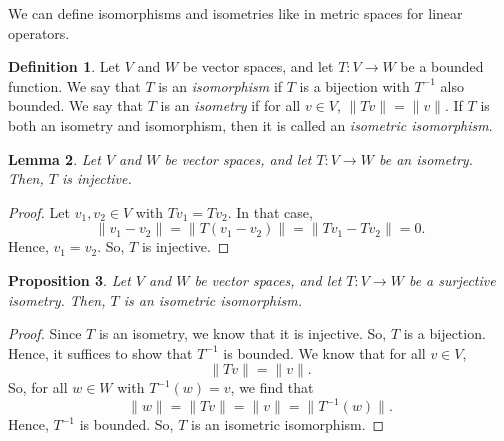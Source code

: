 \documentclass[a4paper, openany]{memoir}
\theoremstyle{definition}
\newtheorem{definition}{Definition}[section]
\theoremstyle{plain}
\newtheorem{lemma}[definition]{Lemma}
\newtheorem{proposition}[definition]{Proposition}
\begin{document}
    We can define isomorphisms and isometries like in metric spaces for linear operators.
    \begin{definition}
        Let $V$ and $W$ be vector spaces, and let $T \colon V \to W$ be a bounded function. We say that $T$ is an \emph{isomorphism} if $T$ is a bijection with $T^{-1}$ also bounded. We say that $T$ is an \emph{isometry} if for all $v \in V$, $\lVert Tv \rVert = \lVert v \rVert$. If $T$ is both an isometry and isomorphism, then it is called an \emph{isometric isomorphism}.
    \end{definition}
    \begin{lemma}
        Let $V$ and $W$ be vector spaces, and let $T \colon V \to W$ be an isometry. Then, $T$ is injective.
    \end{lemma}
    \begin{proof}
        Let $v_1, v_2 \in V$ with $Tv_1 = Tv_2$. In that case,
        \[\lVert v_1 - v_2 \rVert = \lVert T(v_1 - v_2) \rVert = \lVert Tv_1 - Tv_2 \rVert = 0.\]
        Hence, $v_1 = v_2$. So, $T$ is injective.
    \end{proof}
    \begin{proposition}
        Let $V$ and $W$ be vector spaces, and let $T \colon V \to W$ be a surjective isometry. Then, $T$ is an isometric isomorphism.
    \end{proposition}
    \begin{proof}
        Since $T$ is an isometry, we know that it is injective. So, $T$ is a bijection. Hence, it suffices to show that $T^{-1}$ is bounded. We know that for all $v \in V$,
        \[\lVert Tv \rVert = \lVert v \rVert.\]
        So, for all $w \in W$ with $T^{-1}(w) = v$, we find that
        \[\lVert w \rVert =  \lVert Tv \rVert = \lVert v \rVert = \lVert T^{-1}(w) \rVert.\]
        Hence, $T^{-1}$ is bounded. So, $T$ is an isometric isomorphism.
    \end{proof}
\end{document}
